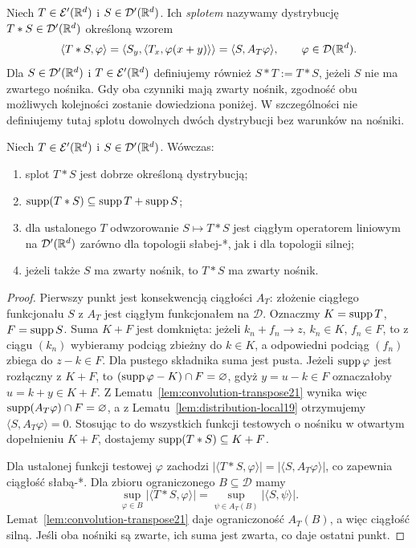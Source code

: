 \begin{definicja}
\label{def:convolution21}
Niech $T\in\mathcal E'(\mathbb R^d)$ i
$S\in\mathcal D'(\mathbb R^d)$. Ich \emph{splotem} nazywamy
dystrybucję $T*S\in\mathcal D'(\mathbb R^d)$ określoną wzorem
\[
 \langle T*S,\varphi\rangle
 =\langle S_y,\langle T_x,\varphi(x+y)\rangle\rangle
 =\langle S,A_T\varphi\rangle,
 \qquad\varphi\in\mathcal D(\mathbb R^d).
\]
Dla $S\in\mathcal D'(\mathbb R^d)$ i $T\in\mathcal E'(\mathbb R^d)$
definiujemy również $S*T:=T*S$, jeżeli $S$ nie ma
zwartego nośnika. Gdy oba czynniki mają zwarty nośnik,
zgodność obu możliwych kolejności zostanie dowiedziona
poniżej. W szczególności nie definiujemy tutaj splotu
dowolnych dwóch dystrybucji bez warunków na nośniki.
\end{definicja}

\begin{twierdzenie}
\label{thm:convolution-properties21}
Niech $T\in\mathcal E'(\mathbb R^d)$ i
$S\in\mathcal D'(\mathbb R^d)$. Wówczas:
\begin{enumerate}
\item splot $T*S$ jest dobrze określoną dystrybucją;
\item $\operatorname{supp}(T*S)\subseteq\operatorname{supp} T+\operatorname{supp} S$;
\item dla ustalonego $T$ odwzorowanie
$S\mapsto T*S$ jest ciągłym operatorem liniowym na
$\mathcal D'(\mathbb R^d)$ zarówno dla topologii słabej-*, jak
i dla topologii silnej;
\item jeżeli także $S$ ma zwarty nośnik, to $T*S$ ma
zwarty nośnik.
\end{enumerate}
\end{twierdzenie}
\begin{proof}
Pierwszy punkt jest konsekwencją ciągłości $A_T$:
złożenie ciągłego funkcjonału $S$ z $A_T$ jest ciągłym
funkcjonałem na $\mathcal D$. Oznaczmy $K=\operatorname{supp} T$, $F=\operatorname{supp} S$. Suma $K+F$
jest domknięta: jeżeli $k_n+f_n\to z$, $k_n\in K$,
$f_n\in F$, to z ciągu $(k_n)$ wybieramy podciąg zbieżny
do $k\in K$, a odpowiedni podciąg $(f_n)$ zbiega do
$z-k\in F$. Dla pustego składnika suma jest pusta.
Jeżeli $\operatorname{supp}\varphi$ jest rozłączny z $K+F$, to
$(\operatorname{supp}\varphi-K)\cap F=\varnothing$, gdyż
$y=u-k\in F$ oznaczałoby $u=k+y\in K+F$.
Z Lematu~\ref{lem:convolution-transpose21} wynika więc
$\operatorname{supp}(A_T\varphi)\cap F=\varnothing$, a z
Lematu~\ref{lem:distribution-local19} otrzymujemy
$\langle S,A_T\varphi\rangle=0$.
Stosując to do wszystkich funkcji testowych o nośniku
w otwartym dopełnieniu $K+F$, dostajemy
$\operatorname{supp}(T*S)\subseteq K+F$.

Dla ustalonej funkcji testowej $\varphi$ zachodzi
$|\langle T*S,\varphi\rangle|=
|\langle S,A_T\varphi\rangle|$, co zapewnia
ciągłość słabą-*. Dla zbioru ograniczonego
$B\subseteq\mathcal D$ mamy
\[
 \sup_{\varphi\in B}|\langle T*S,\varphi\rangle|
 =\sup_{\psi\in A_T(B)}|\langle S,\psi\rangle|.
\]
Lemat~\ref{lem:convolution-transpose21} daje
ograniczoność $A_T(B)$, a więc ciągłość silną.
Jeśli oba nośniki są zwarte, ich suma jest zwarta,
co daje ostatni punkt.
\end{proof}

